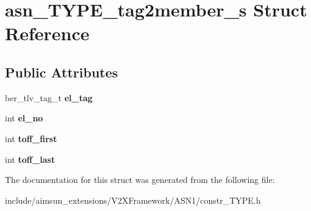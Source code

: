 \hypertarget{structasn__TYPE__tag2member__s}{}\section{asn\+\_\+\+T\+Y\+P\+E\+\_\+tag2member\+\_\+s Struct Reference}
\label{structasn__TYPE__tag2member__s}
\subsection*{Public Attributes}
\begin{DoxyCompactItemize}
\item 
ber\+\_\+tlv\+\_\+tag\+\_\+t {\bfseries el\+\_\+tag}\hypertarget{structasn__TYPE__tag2member__s_a5e6c60c9b693dfe75f474b874ceb5553}{}\label{structasn__TYPE__tag2member__s_a5e6c60c9b693dfe75f474b874ceb5553}

\item 
int {\bfseries el\+\_\+no}\hypertarget{structasn__TYPE__tag2member__s_aa4cc00d29362751105f5440956084cf6}{}\label{structasn__TYPE__tag2member__s_aa4cc00d29362751105f5440956084cf6}

\item 
int {\bfseries toff\+\_\+first}\hypertarget{structasn__TYPE__tag2member__s_aa142c0183296929729d180377f418a56}{}\label{structasn__TYPE__tag2member__s_aa142c0183296929729d180377f418a56}

\item 
int {\bfseries toff\+\_\+last}\hypertarget{structasn__TYPE__tag2member__s_a5ecd9b207d1e711e3791bdb33080b862}{}\label{structasn__TYPE__tag2member__s_a5ecd9b207d1e711e3791bdb33080b862}

\end{DoxyCompactItemize}


The documentation for this struct was generated from the following file\+:\begin{DoxyCompactItemize}
\item 
include/aimsun\+\_\+extensions/\+V2\+X\+Framework/\+A\+S\+N1/constr\+\_\+\+T\+Y\+P\+E.\+h\end{DoxyCompactItemize}
